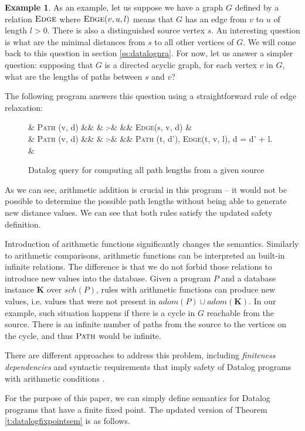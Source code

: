 \documentclass{pracamgr}
\theoremstyle{plain}
\theoremstyle{definition}
\newtheorem{exmp}{Example}[section]
\theoremstyle{remark}
\newcommand{\assign}{:-}
\newcommand{\narrow}[1]{\begin{changemargin}{2cm}{2cm} #1 \end{changemargin}}
\newcommand{\relat}[2]{$\textsc{#1}#2$}
\newcommand{\dprog}[4]{
  \begin{figure}[h!]
    \narrow{
      #1
      \begin{flalign*}
      #2
      \end{flalign*}
      \caption{#3}
      \label{#4}
    }
\end{figure}

}
\begin{document}
\begin{exmp}

As an example, let us suppose we have a graph $G$ defined by a relation $\textsc{Edge}$ 
where \relat{Edge}{(v, u, l)} means that $G$ has an edge from $v$ to $u$ of length $l > 0$. 
There is also a distinguished source vertex $s$.
An interesting question is what are the minimal distances from $s$ to all other vertices of $G$.
We will come back to this question in section \ref{ss:datalognra}.
For now, let us answer a simpler question: supposing that $G$ is a directed acyclic graph, for each vertex $v$ in $G$,
what are the lengths of paths between $s$ and $v$?

The following program answers this question using a straightforward rule of edge relaxation:

\dprog{}{
  & \textsc{Path} (v, d) &&  & \assign & && \textsc{Edge}(s, v, d) & \\
  & \textsc{Path} (v, d) &&  & \assign & && \textsc{Path} (t, d'), \textsc{Edge}(t, v, l), d = d' + l. &\\
}{Datalog query for computing all path lengths from a given source}{ex:pathsdatalog}

As we can see, arithmetic addition is crucial in this program -- it would not be possible to determine the possible path lengths without being able to generate new distance values. We can see that both rules satisfy the updated safety definition.
\end{exmp}

Introduction of arithmetic functions significantly changes the semantics.
Similarly to arithmetic comparisons, arithmetic functions can be interpreted an built-in infinite relations. 
The difference is that we do not forbid those relations to introduce new values into the database.
Given a program $P$ and a database instance $\textbf{K}$ over $sch(P)$, rules with arithmetic functions can produce new values, i.e. values that were not present in $adom(P) \cup adom(\textbf{K})$. In our example, such situation happens if there is a cycle in $G$ reachable from the source. There is an infinite number of paths from the source to the vertices on the cycle, and thus $\textsc{Path}$ would be infinite.

There are different approaches to address this problem, including \emph{finiteness dependencies} and syntactic requirements that imply safety of Datalog programs with arithmetic conditions \cite{RBS87, KRS88a, KRS88b, SV89}.

For the purpose of this paper, we can simply define semantics for Datalog programs that have a finite fixed point. The updated version of Theorem \ref{t:datalogfixpointsem} is as follows.
\end{document}
